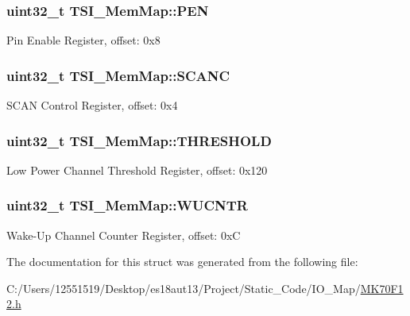 \subsubsection[{P\+E\+N}]{\setlength{\rightskip}{0pt plus 5cm}uint32\+\_\+t T\+S\+I\+\_\+\+Mem\+Map\+::\+P\+E\+N}\label{struct_t_s_i___mem_map_a37c8a06461ca09948d6a65a1289bccd9}
Pin Enable Register, offset\+: 0x8 \hypertarget{struct_t_s_i___mem_map_abbf29c929817b57dbec256343e066a85}{}
\subsubsection[{S\+C\+A\+N\+C}]{\setlength{\rightskip}{0pt plus 5cm}uint32\+\_\+t T\+S\+I\+\_\+\+Mem\+Map\+::\+S\+C\+A\+N\+C}\label{struct_t_s_i___mem_map_abbf29c929817b57dbec256343e066a85}
S\+C\+A\+N Control Register, offset\+: 0x4 \hypertarget{struct_t_s_i___mem_map_a716863c50b790ef08399633c624ad313}{}
\subsubsection[{T\+H\+R\+E\+S\+H\+O\+L\+D}]{\setlength{\rightskip}{0pt plus 5cm}uint32\+\_\+t T\+S\+I\+\_\+\+Mem\+Map\+::\+T\+H\+R\+E\+S\+H\+O\+L\+D}\label{struct_t_s_i___mem_map_a716863c50b790ef08399633c624ad313}
Low Power Channel Threshold Register, offset\+: 0x120 \hypertarget{struct_t_s_i___mem_map_ae36ce42bd55889c91be08af94a07203e}{}
\subsubsection[{W\+U\+C\+N\+T\+R}]{\setlength{\rightskip}{0pt plus 5cm}uint32\+\_\+t T\+S\+I\+\_\+\+Mem\+Map\+::\+W\+U\+C\+N\+T\+R}\label{struct_t_s_i___mem_map_ae36ce42bd55889c91be08af94a07203e}
Wake-\/\+Up Channel Counter Register, offset\+: 0x\+C 

The documentation for this struct was generated from the following file\+:\begin{DoxyCompactItemize}
\item 
C\+:/\+Users/12551519/\+Desktop/es18aut13/\+Project/\+Static\+\_\+\+Code/\+I\+O\+\_\+\+Map/\hyperlink{_m_k70_f12_8h}{M\+K70\+F12.\+h}\end{DoxyCompactItemize}
